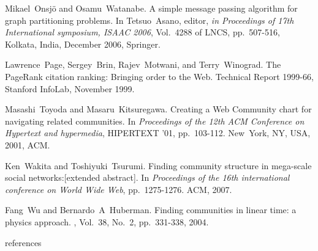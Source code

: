 \documentclass [a4j,11pt] {jsarticle}
\begin{document}
\begin{thebibliography}{10}
Mikael~Onsj\"o and Osamu~Watanabe.
\newblock A simple message passing algorithm for graph partitioning problems.
\newblock In Tetsuo~Asano, editor, {\em in Proceedings of 17th International symposium, ISAAC 2006}, Vol.~4288 of LNCS, pp.~507-516, Kolkata, India, December 2006, Springer.

Lawrence~Page, Sergey~Brin, Rajev~Motwani, and Terry~Winograd.
\newblock The PageRank citation ranking: Bringing order to the Web.
\newblock Technical Report 1999-66, Stanford InfoLab, November 1999.

Masashi~Toyoda and Masaru~Kitsuregawa.
\newblock Creating a Web Community chart for navigating related communities.
\newblock In {\em Proceedings of the 12th ACM Conference on Hypertext and hypermedia}, HIPERTEXT '01, pp.~103-112. New~York, NY, USA, 2001, ACM.

Ken~Wakita and Toshiyuki~Tsurumi.
\newblock Finding community structure in mega-scale social networks:[extended abstract].
\newblock In {\em Proceedings of the 16th international conference on World Wide Web}, pp.~1275-1276. ACM, 2007.

Fang~Wu and Bernardo~A~Huberman.
\newblock Finding communities in linear time: a physics approach.
, Vol.~38, No.~2, pp.~331-338, 2004.

\end {thebibliography}


 {references}
\end{document}
